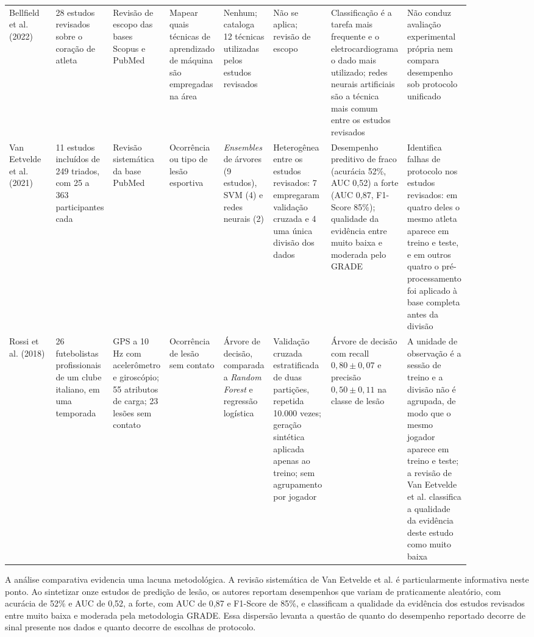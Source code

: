 {\begin{longtable}{L{0.10\linewidth} L{0.11\linewidth} L{0.11\linewidth} L{0.11\linewidth} L{0.10\linewidth} L{0.11\linewidth} L{0.12\linewidth} L{0.12\linewidth}}
Bellfield et al. (2022) \cite{bellfield2022} & 28 estudos revisados sobre o coração de atleta & Revisão de escopo das bases Scopus e PubMed & Mapear quais técnicas de aprendizado de máquina são empregadas na área & Nenhum; cataloga 12 técnicas utilizadas pelos estudos revisados & Não se aplica; revisão de escopo & Classificação é a tarefa mais frequente e o eletrocardiograma o dado mais utilizado; redes neurais artificiais são a técnica mais comum entre os estudos revisados & Não conduz avaliação experimental própria nem compara desempenho sob protocolo unificado \\
\addlinespace

Van Eetvelde et al. (2021) \cite{vaneetvelde2021} & 11 estudos incluídos de 249 triados, com 25 a 363 participantes cada & Revisão sistemática da base PubMed & Ocorrência ou tipo de lesão esportiva & \textit{Ensembles} de árvores (9 estudos), SVM (4) e redes neurais (2) & Heterogênea entre os estudos revisados: 7 empregaram validação cruzada e 4 uma única divisão dos dados & Desempenho preditivo de fraco (acurácia 52\%, AUC 0{,}52) a forte (AUC 0{,}87, F1-Score 85\%); qualidade da evidência entre muito baixa e moderada pelo GRADE & Identifica falhas de protocolo nos estudos revisados: em quatro deles o mesmo atleta aparece em treino e teste, e em outros quatro o pré-proces\-sa\-mento foi aplicado à base completa antes da divisão \\
\addlinespace

Rossi et al. (2018) \cite{rossi2018} & 26 futebolistas profissionais de um clube italiano, em uma temporada & GPS a 10 Hz com acelerômetro e giroscópio; 55 atributos de carga; 23 lesões sem contato & Ocorrência de lesão sem contato & Árvore de decisão, comparada a \textit{Random Forest} e regressão logística & Validação cruzada estratificada de duas partições, repetida 10.000 vezes; geração sintética aplicada apenas ao treino; sem agrupamento por jogador & Árvore de decisão com recall $0{,}80 \pm 0{,}07$ e precisão $0{,}50 \pm 0{,}11$ na classe de lesão & A unidade de observação é a sessão de treino e a divisão não é agrupada, de modo que o mesmo jogador aparece em treino e teste; a revisão de Van Eetvelde et al. classifica a qualidade da evidência deste estudo como muito baixa \\
\end{longtable}
}

A análise comparativa evidencia uma lacuna metodológica. A revisão sistemática de Van Eetvelde et al. \cite{vaneetvelde2021} é particularmente informativa neste ponto. Ao sintetizar onze estudos de predição de lesão, os autores reportam desempenhos que variam de praticamente aleatório, com acurácia de 52\% e AUC de 0{,}52, a forte, com AUC de 0{,}87 e F1-Score de 85\%, e classificam a qualidade da evidência dos estudos revisados entre muito baixa e moderada pela metodologia GRADE. Essa dispersão levanta a questão de quanto do desempenho reportado decorre de sinal presente nos dados e quanto decorre de escolhas de protocolo.

